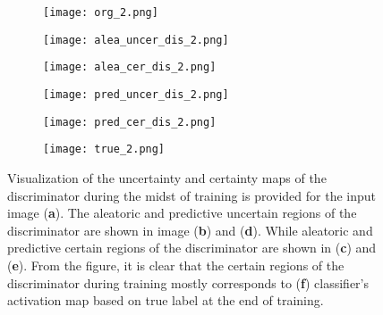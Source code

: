 \documentclass[10pt,twocolumn,letterpaper]{article}
\begin{document}
\begin{figure}[!]
\begin{subfigure}{.155\textwidth}
  \centering
  \texttt{[image: org\_2.png]}
  \caption{}
  \label{fig:sfig1}
\end{subfigure}
\begin{subfigure}{.155\textwidth}
  \centering
  \texttt{[image: alea\_uncer\_dis\_2.png]}
  \caption{}
  \label{fig:sfig2}
\end{subfigure}
\begin{subfigure}{.155\textwidth}
  \centering
  \texttt{[image: alea\_cer\_dis\_2.png]}
  \caption{}
  \label{fig:sfig33}
\end{subfigure}
\begin{subfigure}{.155\textwidth}
  \centering
  \texttt{[image: pred\_uncer\_dis\_2.png]}
  \caption{}
  \label{fig:sfig4}
\end{subfigure}
\begin{subfigure}{.155\textwidth}
  \centering
  \texttt{[image: pred\_cer\_dis\_2.png]}
  \caption{}
  \label{fig:sfig11}
\end{subfigure}
\begin{subfigure}{.155\textwidth}
  \centering
  \texttt{[image: true\_2.png]}
  \caption{}
  \label{fig:sfig111}
\end{subfigure}
\caption{Visualization of the uncertainty and certainty maps of the discriminator during the midst of training is provided for the input image (\textbf{a}). The aleatoric and predictive uncertain regions of the discriminator are shown in image (\textbf{b}) and (\textbf{d}). While aleatoric and predictive certain regions of the discriminator are shown in (\textbf{c}) and (\textbf{e}). From the figure, it is clear that the certain regions of the discriminator during training mostly corresponds to (\textbf{f}) classifier's activation map based on true label at the end of training.} 
\label{fig:intro}
\vspace{-1.5em}
\end{figure}
\end{document}
